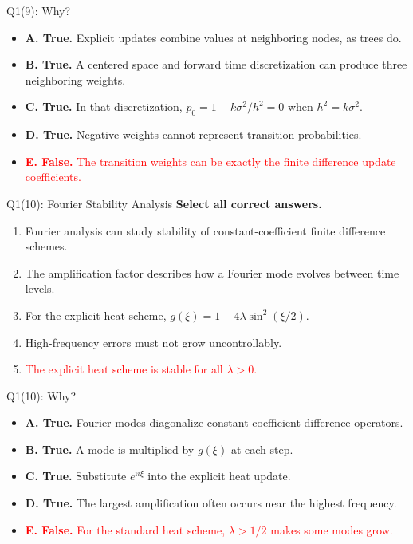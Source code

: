\documentclass{beamer}
\newcommand{\wrong}[1]{\textcolor{red}{#1}}
\begin{document}
\begin{frame}{Q1(9): Why?}
\small
\begin{itemize}
\item \textbf{A. True.} Explicit updates combine values at neighboring
nodes, as trees do.
\item \textbf{B. True.} A centered space and forward time discretization
can produce three neighboring weights.
\item \textbf{C. True.} In that discretization,
$p_0=1-k\sigma^2/h^2=0$ when $h^2=k\sigma^2$.
\item \textbf{D. True.} Negative weights cannot represent
transition probabilities.
\item \wrong{\textbf{E. False.} The transition weights can be
exactly the finite difference update coefficients.}
\end{itemize}
\end{frame}

\begin{frame}{Q1(10): Fourier Stability Analysis}
\small
\textbf{Select all correct answers.}
\begin{enumerate}
\item[A.] Fourier analysis can study stability of constant-coefficient
finite difference schemes.
\item[B.] The amplification factor describes how a Fourier mode
evolves between time levels.
\item[C.] For the explicit heat scheme,
$g(\xi)=1-4\lambda\sin^2(\xi/2)$.
\item[D.] High-frequency errors must not grow uncontrollably.
\item[\wrong{E.}] \wrong{The explicit heat scheme is stable for all
$\lambda>0$.}
\end{enumerate}
\end{frame}

\begin{frame}{Q1(10): Why?}
\small
\begin{itemize}
\item \textbf{A. True.} Fourier modes diagonalize constant-coefficient
difference operators.
\item \textbf{B. True.} A mode is multiplied by $g(\xi)$ at each step.
\item \textbf{C. True.} Substitute $e^{\mathrm{i}i\xi}$ into the
explicit heat update.
\item \textbf{D. True.} The largest amplification often occurs near
the highest frequency.
\item \wrong{\textbf{E. False.} For the standard heat scheme,
$\lambda>1/2$ makes some modes grow.}
\end{itemize}
\end{frame}
\end{document}

